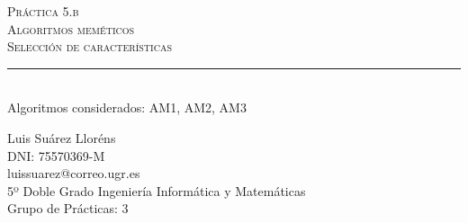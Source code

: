 \begin{titlepage}

\newcommand{\HRule}{\rule{\linewidth}{0.5mm}} %

\center %
 

\textsc{\LARGE Práctica 5.b}\\[1.0cm] %
\textsc{\Large Algoritmos meméticos}\\[0.5cm] %
\textsc{\large Selección de características}\\[0.5cm] %


\HRule \\[0.4cm]
{Algoritmos considerados: AM1, AM2, AM3}\\[0.4cm] %

 

\begin{minipage}{1\textwidth}
\begin{flushleft} \large
Luis Suárez Lloréns\\
DNI: 75570369-M\\
luissuarez@correo.ugr.es\\
5º Doble Grado Ingeniería Informática y Matemáticas\\
Grupo de Prácticas: 3
\end{flushleft}
\end{minipage}




\end{titlepage}

